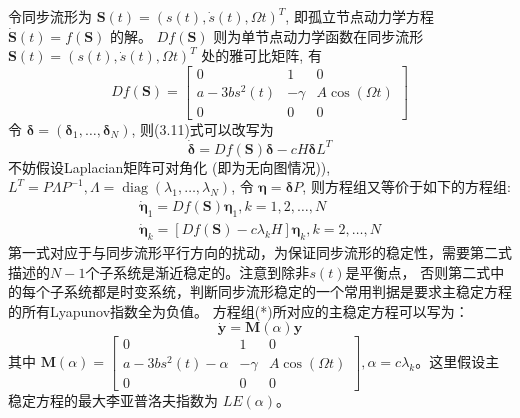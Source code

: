 令同步流形为 $\mathbf{S}(t)=(s(t), \dot{s}(t), \Omega t)^T$, 即孤立节点动力学方程 $\dot{\mathbf{S}}(t)=f(\mathbf{S})$ 的解。
$D f(\mathbf{S})$ 则为单节点动力学函数在同步流形 $\mathbf{S}(t)=(s(t), \dot{s}(t), \Omega t)^T$ 处的雅可比矩阵, 有
\begin{equation}
    D f(\mathbf{S})=\left[\begin{array}{ccc}
    0 & 1 & 0 \\
    a-3 b s^2(t) & -\gamma & A \cos (\Omega t) \\
    0 & 0 & 0
    \end{array}\right]
\end{equation}
令 $\boldsymbol{\delta}=\left(\boldsymbol{\delta}_1, \ldots, \boldsymbol{\delta}_N\right)$, 则(3.11)式可以改写为
\begin{equation}
    \dot{\boldsymbol{\delta}}=D f(\mathbf{S}) \boldsymbol{\delta}-c H \boldsymbol{\delta} L^T
\end{equation}
不妨假设Laplacian矩阵可对角化 (即为无向图情况)), $L^T=P \Lambda P^{-1}, \Lambda=\operatorname{diag}\left(\lambda_1, \ldots, \lambda_N\right)$, 
令 $\boldsymbol{\eta}=\boldsymbol{\delta} P$, 则方程组又等价于如下的方程组:
\begin{equation}
    \begin{gathered}
    \dot{\boldsymbol{\eta}}_1=D f(\mathbf{S}) \boldsymbol{\eta}_1, k=1,2, \ldots, N \\
    \dot{\boldsymbol{\eta}}_k=\left[D f(\mathbf{S})-c \lambda_k H\right] \boldsymbol{\eta}_k, k=2, \ldots, N
    \end{gathered}
\end{equation}
第一式对应于与同步流形平行方向的扰动，为保证同步流形的稳定性，需要第二式描述的$N-1$个子系统是渐近稳定的。注意到除非$s(t)$是平衡点，
否则第二式中的每个子系统都是时变系统，判断同步流形稳定的一个常用判据是要求主稳定方程的所有Lyapunov指数全为负值。
方程组(*)所对应的主稳定方程可以写为：
\begin{equation}
    \dot{\boldsymbol{y}}=\boldsymbol{M}(\alpha)\boldsymbol{y}
\end{equation}
其中 $\boldsymbol{M}(\alpha)=\left[\begin{array}{ccc}0 & 1 & 0 \\ a-3 b s^2(t)-\alpha & -\gamma & A \cos (\Omega t)
\\ 0 & 0 & 0\end{array}\right], \alpha=c \lambda_k$。这里假设主稳定方程的最大李亚普洛夫指数为 $LE(\alpha)$。

